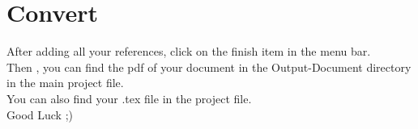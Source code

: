 \documentclass{article}
\begin{document}
\section{Convert}
After adding all your references, click on the finish item in the menu bar.\\
Then , you can find the pdf of your document in the Output-Document directory in the main
project file.\\
You can also find your .tex file in the project file.\\
Good Luck ;)\\
\begin{thebibliography}{0}
\end{thebibliography}
\end{document}
